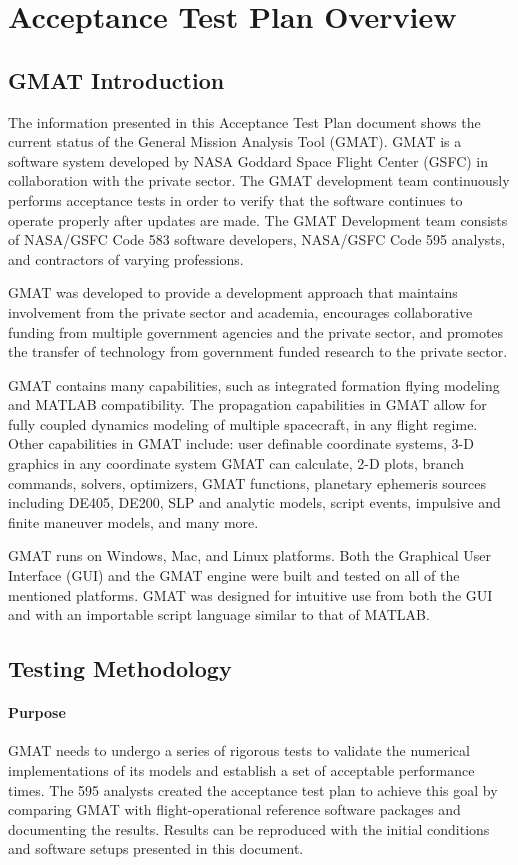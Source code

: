 \chapter{Acceptance Test Plan Overview} \label{Ch:AcceptPlanIntro}

\section{GMAT Introduction}
The information presented in this Acceptance Test Plan document
shows the current status of the General Mission Analysis Tool
(GMAT). GMAT is a software system developed by NASA Goddard Space
Flight Center (GSFC) in collaboration with the private sector. The
GMAT development team continuously performs acceptance tests in
order to verify that the software continues to operate properly
after updates are made. The GMAT Development team consists of
NASA/GSFC Code 583 software developers, NASA/GSFC Code 595 analysts,
and contractors of varying professions.

GMAT was developed to provide a development approach that maintains
involvement from the private sector and academia, encourages
collaborative funding from multiple government agencies and the
private sector, and promotes the transfer of technology from
government funded research to the private sector.

GMAT contains many capabilities, such as integrated formation flying
modeling and MATLAB compatibility. The propagation
capabilities in GMAT allow for fully coupled dynamics modeling of
multiple spacecraft, in any flight regime. Other capabilities in
GMAT include: user definable coordinate systems, 3-D graphics in any
coordinate system GMAT can calculate, 2-D plots, branch commands,
solvers, optimizers, GMAT functions, planetary ephemeris sources
including DE405, DE200, SLP and
analytic models, script events, impulsive and finite maneuver
models, and many more.

GMAT runs on Windows, Mac, and Linux platforms. Both the Graphical
User Interface (GUI) and the GMAT engine were built and tested on
all of the mentioned platforms. GMAT was designed for intuitive use
from both the GUI and with an importable script language similar to
that of MATLAB.

\section{Testing Methodology}
\subsubsection{Purpose}
GMAT needs to undergo a series of rigorous tests to validate the
numerical implementations of its models and establish a set of
acceptable performance times. The 595 analysts created the
acceptance test plan to achieve this goal by comparing GMAT with
flight-operational reference software packages and documenting the
results. Results can be reproduced with the initial conditions and
software setups presented in this document.

